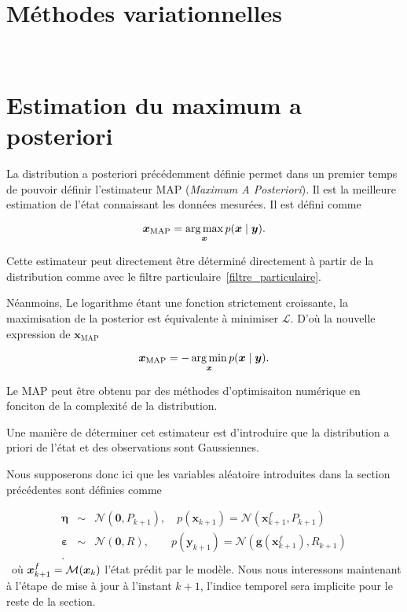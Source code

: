 \section{Méthodes variationnelles}~\label{sec:variation}
\section{Estimation du maximum a posteriori}

La distribution a posteriori précédemment définie permet dans un premier temps de pouvoir définir l'estimateur MAP (\textit{Maximum A Posteriori}). Il est la meilleure estimation de l'état connaissant les données mesurées. Il est défini comme

\begin{equation*}
    \bm x_{\text{MAP}} = \operatorname*{arg\,max}_{\bm x} p(\bm x \mid \bm y).
\end{equation*}

Cette estimateur peut directement être déterminé directement à partir de la distribution comme avec le filtre particulaire~\ref{filtre_particulaire}.

Néanmoins, Le logarithme étant une fonction strictement croissante, la maximisation de la posterior est équivalente à minimiser $\mathcal L$. D'où la nouvelle expression de $\bm x_{\text{MAP}}$

\begin{equation*}
    \bm x_{\text{MAP}} = - \operatorname*{arg\,min}_{\bm x} p(\bm x \mid \bm y).
\end{equation*}

Le MAP peut être obtenu par des méthodes d'optimisaiton numérique en fonciton de la complexité de la distribution.

Une manière de déterminer cet estimateur est d'introduire que la distribution a priori de l'état et des observations sont Gaussiennes.

Nous supposerons donc ici que les variables aléatoire introduites dans la section précédentes sont définies comme

\begin{eqnarray*}
    \bm \eta &\sim& \mathcal{N}(\bm 0, P_{k+1}), \quad p(\bm x_{k+1}) = \mathcal{N}(\bm x_{k+1}^f, P_{k+1})\\
    \bm \varepsilon & \sim & \mathcal N(\bm 0, R), \quad \quad p(\bm y_{k+1}) = \mathcal{N}(\bm g(\bm x_{k+1}^f) , R_{k+1})\\.
\end{eqnarray*}~où $\bm x_{k+1}^f = \mathcal{M}(\bm{x}_{k})$ l'état prédit par le modèle. Nous nous interessons maintenant à l'étape de mise à jour à l'instant $k+1$, l'indice temporel sera implicite pour le reste de la section.

